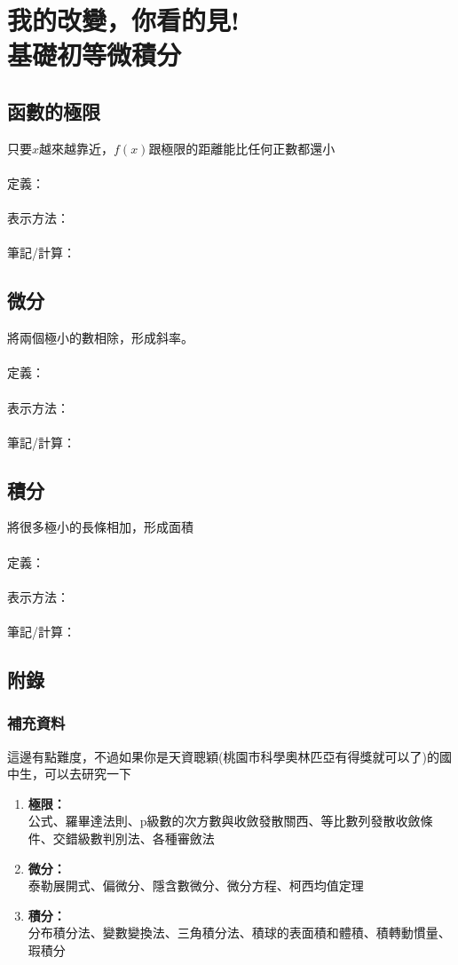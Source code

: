 \chapter{我的改變，你看的見!\\基礎初等微積分}

\section{函數的極限}
只要$x$越來越靠近，$f(x)$跟極限的距離能比任何正數都還小 \\ \\
定義：\\ \\ 
表示方法：\\ \\
筆記/計算：\\
\newpage
\section{微分}
將兩個極小的數相除，形成斜率。 \\ \\
定義：\\ \\ 
表示方法：\\ \\
筆記/計算：\\
\newpage
\section{積分}
將很多極小的長條相加，形成面積 \\ \\
定義：\\ \\ 
表示方法：\\ \\
筆記/計算：\\
\newpage
\section{附錄}
\subsection{補充資料}
這邊有點難度，不過如果你是天資聰穎(桃園市科學奧林匹亞有得獎就可以了)的國中生，可以去研究一下 \\
\begin{enumerate}
\item \textbf{極限：} \\
公式、羅畢達法則、p級數的次方數與收斂發散關西、等比數列發散收斂條件、交錯級數判別法、各種審斂法
\item \textbf{微分：} \\
泰勒展開式、偏微分、隱含數微分、微分方程、柯西均值定理
\item \textbf{積分：}\\
分布積分法、變數變換法、三角積分法、積球的表面積和體積、積轉動慣量、瑕積分
\end{enumerate}
